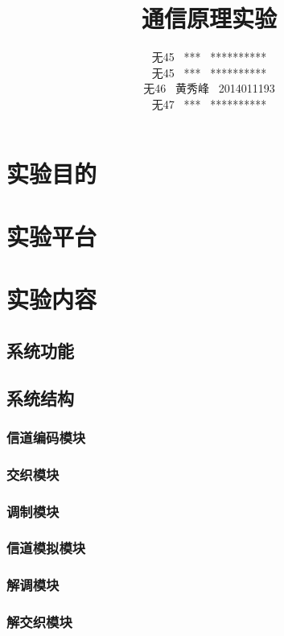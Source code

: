 \documentclass[UTF8]{ctexart}
\date{}
\title{\textbf{通信原理实验}}
\author{无45 \ *** \ **********\\
        无45 \ *** \ **********\\
        无46 \ 黄秀峰 \ 2014011193\\
        无47 \ *** \ **********}
\begin{document}
\maketitle

\section{实验目的}

\section{实验平台}

\section{实验内容}

\subsection{系统功能}

\subsection{系统结构}

\subsubsection{信道编码模块}

\subsubsection{交织模块}

\subsubsection{调制模块}

\subsubsection{信道模拟模块}

\subsubsection{解调模块}

\subsubsection{解交织模块}
\end{document}
